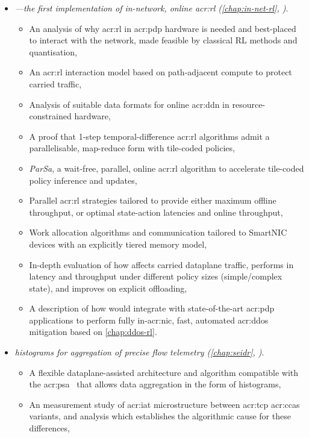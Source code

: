 \begin{itemize}
\begin{itemize}
	\end{itemize}
	\item \emph{\approachshort---the first implementation of in-network, online \gls{acr:rl} (\cref{chap:in-net-rl}, )}.
	\begin{itemize}
		\item An analysis of why \gls{acr:rl} in \gls{acr:pdp} hardware is needed and best-placed to interact with the network, made feasible by classical RL methods and quantisation,
		\item An \gls{acr:rl} interaction model based on path-adjacent compute to protect carried traffic,
		\item Analysis of suitable data formats for online \gls{acr:ddn} in resource-constrained hardware,
		\item A proof that 1-step temporal-difference \gls{acr:rl} algorithms admit a parallelisable, map-reduce form with tile-coded policies,
		\item \emph{ParSa}, a wait-free, parallel, online \gls{acr:rl} algorithm to accelerate tile-coded policy inference and updates,
		\item Parallel \gls{acr:rl} strategies tailored to provide either maximum offline throughput, or optimal state-action latencies and online throughput,
		\item Work allocation algorithms and communication tailored to SmartNIC devices with an explicitly tiered memory model,
		\item In-depth evaluation of how \approachshort{} affects carried dataplane traffic, performs in latency and throughput under different policy sizes (simple/complex state), and improves on explicit offloading,
		\item A description of how \approachshort{} would integrate with state-of-the-art \gls{acr:pdp} applications to perform fully in-\gls{acr:nic}, fast, automated \gls{acr:ddos} mitigation based on \cref{chap:ddos-rl}.
	\end{itemize}
	\item \emph{\seidr{} histograms for aggregation of precise flow telemetry (\cref{chap:seidr}, )}.
	\begin{itemize}
		\item A flexible dataplane-assisted architecture and algorithm compatible with the \gls{acr:psa}~\parencite{p4-psa} that allows data aggregation in the form of histograms,
		\item An measurement study of \gls{acr:iat} microstructure between \gls{acr:tcp} \glspl{acr:cca} variants, and analysis which establishes the algorithmic cause for these differences,

\end{itemize}
\end{itemize}
